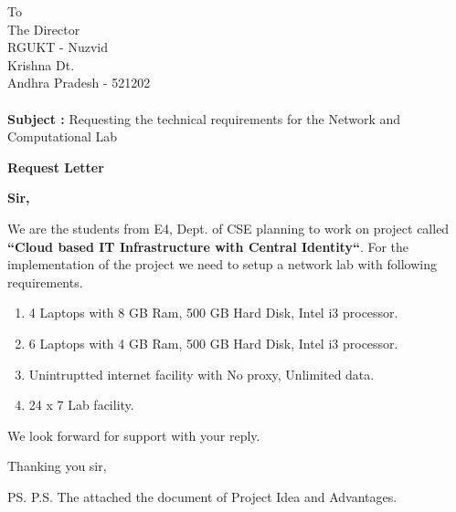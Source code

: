\documentclass{letter}
\begin{document}

\begin{letter}{To \\ The Director \\ RGUKT - Nuzvid \\ Krishna Dt. \\ Andhra Pradesh - 521202 \\  \textbf{ \\ Subject : }  Requesting the technical requirements for the Network and Computational Lab \\} %



\begin{center}
\Large
\textbf{Request Letter}
\end{center}

\normalsize



\opening{\textbf{Sir,}}
 
\hspace{1cm} We are the students from E4, Dept. of CSE planning to work on project called \textbf{``Cloud based IT Infrastructure with Central Identity``}. For the implementation of the project we need to setup a network lab with following requirements.

\begin{enumerate}

	\item 4 Laptops with 8 GB Ram, 500 GB Hard Disk, Intel i3 processor.
	\item 6 Laptops with 4 GB Ram, 500 GB Hard Disk, Intel i3 processor.
	\item Unintruptted internet facility with No proxy, Unlimited data.
	\item 24 x 7 Lab facility.
	
\end{enumerate}	

	We look forward for support with your reply.

\vspace{1\parskip} %
\closing{ Thanking you sir,}
\vspace{7\parskip} %

\ps{P.S. The attached the document of Project Idea and Advantages.} %



\end{letter}
 
\end{document}
